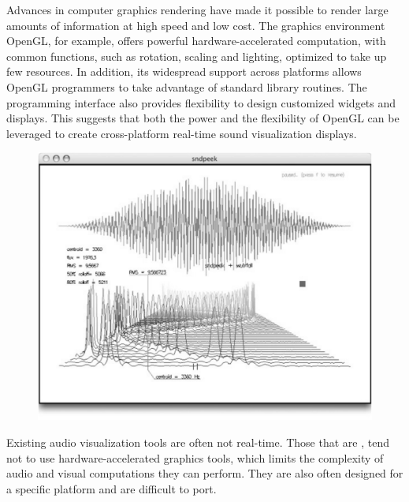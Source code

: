 \documentclass{article}
\begin{document}
Advances in computer graphics rendering have made it possible to render large amounts of information at high 
speed and low cost. The graphics environment OpenGL, for example, offers powerful hardware-accelerated computation, 
with common functions, such as rotation, scaling and lighting, optimized to take up few resources. In addition, its 
widespread support across platforms allows OpenGL programmers to take advantage of standard library routines.
The programming interface also provides flexibility to 
design customized widgets and displays. This suggests that both the power and the flexibility of OpenGL can be 
leveraged to create cross-platform real-time sound visualization displays.

\begin{figure}
\center
\includegraphics[width=\columnwidth]{sndpeek2_bw}
\end{figure}

Existing audio visualization tools are often not real-time. Those that are \cite{Lauer:03, Deadlinks:05}, 
tend not to use hardware-accelerated graphics tools, which limits the complexity of audio and visual computations they can perform. They are also often designed for a specific platform and are difficult to port.
\end{document}
